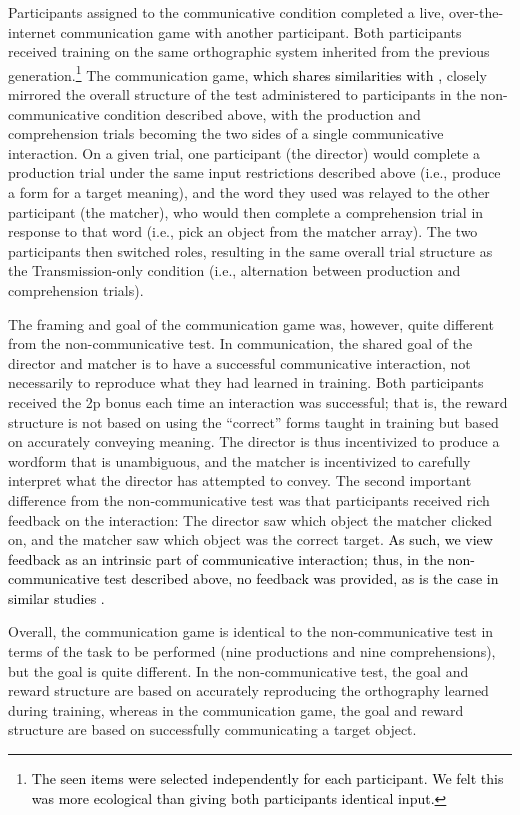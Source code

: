 \documentclass[doc,biblatex]{apa7}
\newcommand\firstrevision[1]{\textcolor{black}{#1}}
\begin{document}
Participants assigned to the communicative condition completed a live, over-the-internet communication game with another participant. Both participants received training on the same orthographic system inherited from the previous generation.\footnote{\firstrevision{The seen items were selected independently for each participant. We felt this was more ecological than giving both participants identical input.}} The communication game, \firstrevision{which shares similarities with \textcite{Kirby:2015},} closely mirrored the overall structure of the test administered to participants in the non-communicative condition described above, with the production and comprehension trials becoming the two sides of a single communicative interaction. On a given trial, one participant (the director) would complete a production trial under the same input restrictions described above (i.e., produce a form for a target meaning), and the word they used was relayed to the other participant (the matcher), who would then complete a comprehension trial in response to that word (i.e., pick an object from the matcher array). The two participants then switched roles, resulting in the same overall trial structure as the Transmission-only condition (i.e., alternation between production and comprehension trials).

The framing and goal of the communication game was, however, quite different from the non-communicative test. In communication, the shared goal of the director and matcher is to have a successful communicative interaction, not necessarily to reproduce what they had learned in training. Both participants received the 2p bonus each time an interaction was successful; that is, the reward structure is not based on using the ``correct'' forms taught in training but based on accurately conveying meaning. The director is thus incentivized to produce a wordform that is unambiguous, and the matcher is incentivized to carefully interpret what the director has attempted to convey. The second important difference from the non-communicative test was that participants received rich feedback on the interaction: The director saw which object the matcher clicked on, and the matcher saw which object was the correct target. \firstrevision{As such, we view feedback as an intrinsic part of communicative interaction; thus, in the non-communicative test described above, no feedback was provided, as is the case in similar studies \parencite{Carr:2017, Motamedi:2019, Saldana:2019, Silvey:2019}.}

Overall, the communication game is identical to the non-communicative test in terms of the task to be performed (nine productions and nine comprehensions), but the goal is quite different. In the non-communicative test, the goal and reward structure are based on accurately reproducing the orthography learned during training, whereas in the communication game, the goal and reward structure are based on successfully communicating a target object.
\end{document}
